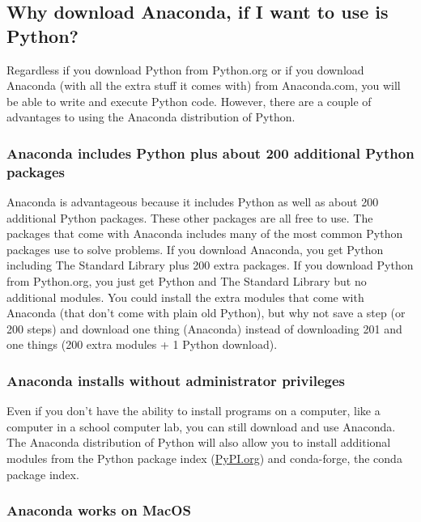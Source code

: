 \documentclass{book}
\begin{document}
    
        \subsection{Why download Anaconda, if I want to use is
Python?}\label{why-download-anaconda-if-i-want-to-use-is-python}

Regardless if you download Python from Python.org or if you download
Anaconda (with all the extra stuff it comes with) from Anaconda.com, you
will be able to write and execute Python code. However, there are a
couple of advantages to using the Anaconda distribution of Python.

\subsubsection{Anaconda includes Python plus about 200 additional Python
packages}\label{anaconda-includes-python-plus-about-200-additional-python-packages}

Anaconda is advantageous because it includes Python as well as about 200
additional Python packages. These other packages are all free to use.
The packages that come with Anaconda includes many of the most common
Python packages use to solve problems. If you download Anaconda, you get
Python including The Standard Library plus 200 extra packages. If you
download Python from Python.org, you just get Python and The Standard
Library but no additional modules. You could install the extra modules
that come with Anaconda (that don't come with plain old Python), but why
not save a step (or 200 steps) and download one thing (Anaconda) instead
of downloading 201 and one things (200 extra modules + 1 Python
download).

\subsubsection{Anaconda installs without administrator
privileges}\label{anaconda-installs-without-administrator-privileges}

Even if you don't have the ability to install programs on a computer,
like a computer in a school computer lab, you can still download and use
Anaconda. The Anaconda distribution of Python will also allow you to
install additional modules from the Python package index
(\href{https://pypi.org/}{PyPI.org}) and conda-forge, the conda package
index.

\subsubsection{Anaconda works on MacOS}\label{anaconda-works-on-macos}
\end{document}

